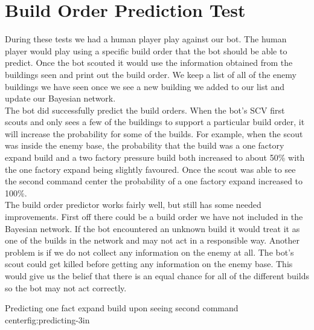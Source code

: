 \section{Build Order Prediction Test}
During these tests we had a human player play against our bot. The human player would play using a specific build order that the bot should be able to predict. Once the bot scouted it would use the information obtained from the buildings seen and print out the build order. We keep a list of all of the enemy buildings we have seen once we see a new building we added to our list and update our Bayesian network.\\
The bot did successfully predict the build orders. When the bot's SCV first scouts and only sees a few of the buildings to support a particular build order, it will increase the probability for some of the builds. For example, when the scout was inside the enemy base, the probability that the build was a one factory expand build and a two factory pressure build both increased to about 50\% with the one factory expand being slightly favoured. Once the scout was able to see the second command center the probability of a one factory expand increased to 100\%. 
\\
The build order predictor works fairly well, but still has some needed improvements. First off there could be a build order we have not included in the Bayesian network. If the bot encountered an unknown build it would treat it as one of the builds in the network and may not act in a responsible way. Another problem is if we do not collect any information on the enemy at all. The bot's scout could get killed before getting any information on the enemy base. This would give us the belief that there is an equal chance for all of the different builds so the bot may not act correctly.


			{Predicting one fact expand build upon seeing second command center}{fig:predicting}{-3in}
